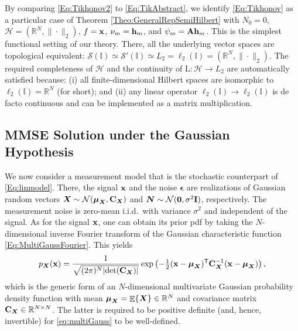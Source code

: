 \documentclass[11pt, english,english]{article}
\newcommand{\R}{ \mathbb{R}}
\def\V#1{{\boldsymbol{#1}}}         %
\def\Spc#1{{\mathcal{#1}}}  %
\def\M#1{{\bf{#1}}}  %
\def\Op#1{{\mathrm{#1}}}  %
\def\Exp{\mathop{\mathbb{E}}\nolimits}
\renewcommand{\[}{\begin{equation}}
\renewcommand{\]}[1]{\label{eq:#1}\end{equation}}
\def\Exp{\mathop{\mathbb{E}}\nolimits}
\def\VRand#1{{\uppercase{\boldsymbol #1}}}         %
\newcommand{\Tr}{\mathsf{T}}
\begin{document}
By comparing \eqref{Eq:Tikhonov2} to \eqref{Eq:TikAbstract}, we identify \eqref{Eq:Tikhonov} as a particular case of
Theorem \ref{Theo:GeneralRepSemiHilbert} with $N_0=0$,  $\Spc H=(\R^N,\|\cdot\|_2)$,  $f=\M x$, $\nu_m=\M h_m$, and $\psi_m= \M A \M h_m$.
This is the simplest functional setting of our theory. There, all the underlying vector spaces are topological equivalent: $\Spc S(\mathbb{I})\simeq\Spc S'(\mathbb{I})\simeq
L_2=\ell_2(\mathbb{I})=(\R^N,\|\cdot\|_2)$. The required completeness of $\Spc H$ and the continuity of $\Op L: \Spc H \to L_2$  are automatically satisfied because: (i)  all finite-dimensional Hilbert spaces are isomorphic to $\ell_2(\mathbb{I})=\R^N$ (for short);
and (ii) any linear operator $\ell_2(\mathbb{I})\to\ell_2(\mathbb{I})$ is de facto continuous and can be implemented as a matrix multiplication.

\subsection{MMSE Solution under the Gaussian Hypothesis}
We now consider a measurement model that is the stochastic counterpart of \eqref{Eq:linmodel}. There,
the signal $\M x$ and the noise $\V \epsilon$ are realizations of Gaussian random
vectors $\VRand X \sim \Spc N(\V \mu_{\VRand x},\M C_{\VRand x})$ and $\VRand N \sim \Spc N(\M 0,\sigma^2 \M I)$, respectively. The measurement noise is zero-mean i.i.d.\ with variance $\sigma^2$ and independent of the signal. As for the signal $\M x$, one can obtain
its prior pdf by taking the $N$-dimensional inverse Fourier transform of the Gaussian characteristic function \eqref{Eq:MultiGaussFourier}. This yields
\begin{align}
\label{eq:multiGauss}
p_\VRand x(\M x)=\frac{1}{\sqrt{(2 \pi)^{N} |{\rm det}(\M C_{\VRand x})|}} \exp\left(-\tfrac{1}{2}(\M x-\V \mu_{\VRand x})^\Tr \M C_{\VRand x}^{-1} (\M x-\V \mu_{\VRand X})\right),
\end{align}
which is the generic form of an $N$-dimensional multivariate Gaussian probability density function with mean $\V \mu_{\VRand X}=\Exp\{\VRand X\} \in \R^N$ and covariance matrix 
$\M C_{\VRand x} \in \R^{N \times N}$. The latter is required to be positive definite (and, hence, invertible) for \eqref{eq:multiGauss} to be well-defined.
\end{document}
